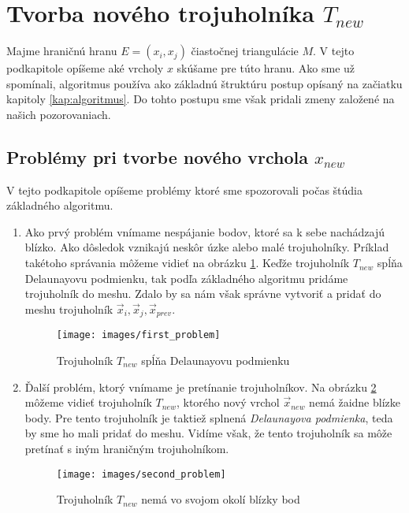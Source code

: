 \section{Tvorba nového trojuholníka $T_{new}$}

Majme hraničnú hranu $E=(x_i, x_j)$ čiastočnej triangulácie $M$. V tejto podkapitole opíšeme 
aké vrcholy $x$ skúšame pre túto hranu. Ako sme už spomínali, algoritmus používa ako 
základnú štruktúru postup opísaný na začiatku kapitoly \ref{kap:algoritmus}. 
Do tohto postupu sme však pridali zmeny založené na našich pozorovaniach.

\subsection{Problémy pri tvorbe nového vrchola $x_{new}$}

V tejto podkapitole opíšeme problémy ktoré sme spozorovali počas štúdia základného 
algoritmu.

\begin{enumerate}

\item{
    Ako prvý problém vnímame nespájanie bodov, ktoré sa k sebe nachádzajú blízko. Ako dôsledok vznikajú 
    neskôr úzke alebo malé trojuholníky. Príklad takétoho správania môžeme vidieť na obrázku 
    \ref{obr:first_problem}. Keďže trojuholník $T_{new}$ spĺňa Delaunayovu podmienku, tak podľa 
    základného algoritmu pridáme trojuholník do meshu. Zdalo by sa nám však správne vytvoriť a 
    pridať do meshu trojuholník $\overrightarrow{x}_i, \overrightarrow{x}_j, \overrightarrow{x}_{prev}$. 

    \begin{figure}
        \centerline{\texttt{[image: images/first\_problem]}}
        \caption[Trojuholník $T_{new}$ spĺňa Delaunayovu podmienku]{Trojuholník $T_{new}$ spĺňa Delaunayovu podmienku}
        \label{obr:first_problem}
    \end{figure}
}

\item{
    Ďalší problém, ktorý vnímame je pretínanie trojuholníkov. Na obrázku \ref{obr:second_problem} môžeme
    vidieť trojuholník $T_{new}$, ktorého nový vrchol $\overrightarrow{x}_{new}$ nemá žaidne blízke body. 
    Pre tento trojuholník je taktiež splnená \textit{Delaunayova podmienka}, teda by sme ho mali pridať 
    do meshu. Vidíme však, že tento trojuholník sa môže pretínať s iným hraničným trojuholníkom.

    \begin{figure}
        \centerline{\texttt{[image: images/second\_problem]}}
        \caption[Trojuholník $T_{new}$ nemá vo svojom okolí blízky bod]{Trojuholník $T_{new}$ nemá vo svojom okolí blízky bod}
        \label{obr:second_problem}
    \end{figure}
}

\end{enumerate}
  
